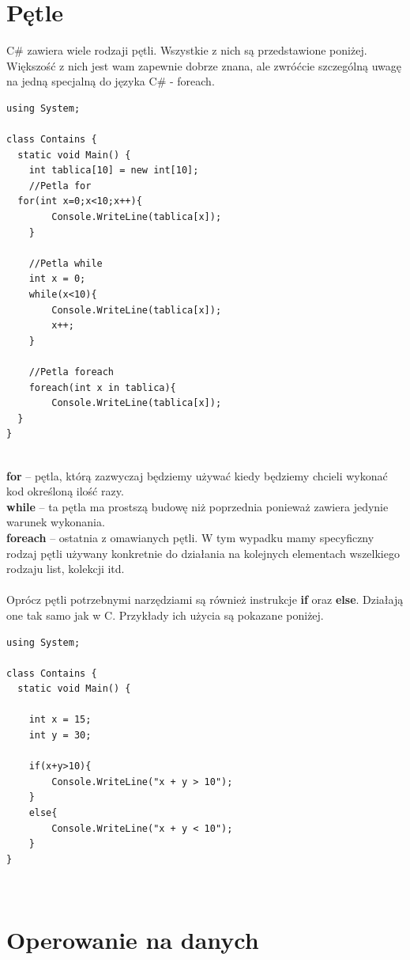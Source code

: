 \documentclass[a4paper]{article}
\theoremstyle{definition}
\begin{document}
\section{Pętle}
C\# zawiera wiele rodzaji pętli. Wszystkie z nich są przedstawione poniżej. Większość z nich jest wam zapewnie dobrze znana, ale zwróćcie szczególną uwagę na jedną specjalną do języka C\# - foreach.\\
\begin{lstlisting}[frame=single]
using System;

class Contains {
  static void Main() {
	int tablica[10] = new int[10];
	//Petla for
  for(int x=0;x<10;x++){
		Console.WriteLine(tablica[x]);
	}
	
	//Petla while
	int x = 0;
	while(x<10){
		Console.WriteLine(tablica[x]);
		x++;
	}

	//Petla foreach
	foreach(int x in tablica){
		Console.WriteLine(tablica[x]);
  }
}
\end{lstlisting}\\
\textbf{for} – pętla, którą zazwyczaj będziemy używać kiedy będziemy chcieli wykonać kod określoną ilość razy.\\
\textbf{while} – ta pętla ma prostszą budowę niż poprzednia ponieważ zawiera jedynie warunek wykonania. \\
\textbf{foreach} – ostatnia z omawianych pętli. W tym wypadku mamy specyficzny rodzaj pętli używany konkretnie do działania na kolejnych elementach wszelkiego rodzaju list, kolekcji itd.\\
\\Oprócz pętli potrzebnymi narzędziami są również instrukcje \textbf{if} oraz \textbf{else}. Działają one tak samo jak w C. Przykłady ich użycia są pokazane poniżej.\\
\begin{lstlisting}[frame=single]
using System;

class Contains {
  static void Main() {

	int x = 15;
	int y = 30;

	if(x+y>10){
		Console.WriteLine("x + y > 10");
	}
	else{
		Console.WriteLine("x + y < 10");
	}
}
\end{lstlisting}\\
\pagebreak
\section{Operowanie na danych}
\end{document}
